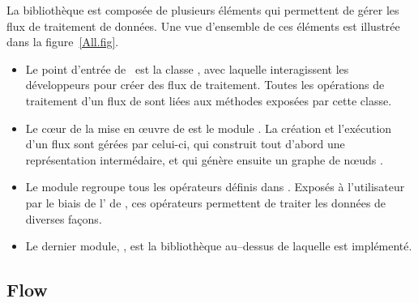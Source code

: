 La biblioth\`eque  est compos\'ee de plusieurs éléments qui permettent de g\'erer les flux de traitement de donn\'ees. Une vue d'ensemble de ces éléments est illustr\'ee dans la figure~\ref{All.fig}.

\begin{itemize}

\item Le point d'entr\'ee de \ppff\ est la classe , avec laquelle interagissent les d\'eveloppeurs pour cr\'eer des flux de traitement. Toutes les op\'erations de traitement d'un flux de  sont li\'ees aux m\'ethodes expos\'ees par cette classe. 

\item Le c\oe{}ur de la mise en \oe{}uvre de  est le module . La cr\'eation et l'ex\'ecution d'un flux sont g\'er\'ees par celui-ci, qui construit tout d'abord une représentation intermédaire, et qui génère ensuite un graphe de n\oe{}uds .

\item  Le module  regroupe tous les op\'erateurs d\'efinis dans . Expos\'es \`a l'utilisateur par le biais de l' de , ces op\'erateurs permettent de traiter les donn\'ees de diverses façons.

\item Le dernier module, , est la biblioth\`eque au–dessus de laquelle  est impl\'ement\'e.


\end{itemize}

\subsection{Flow}
\label{flow.chap}

